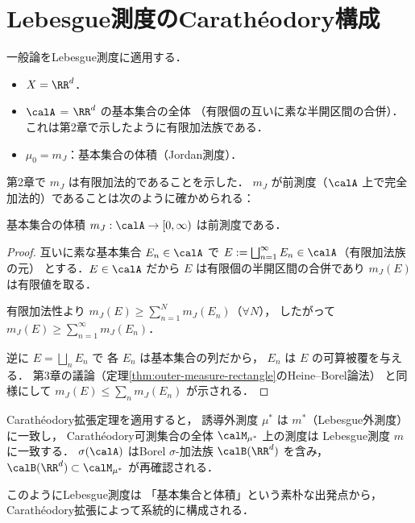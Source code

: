 \section{Lebesgue測度のCarath\'eodory構成}\label{sec:lebesgue-caratheodory}

一般論をLebesgue測度に適用する．

\begin{itemize}
\item $X = \RR^d$．
\item $\calA$ = $\RR^d$ の基本集合の全体
（有限個の互いに素な半開区間の合併）．
これは第2章で示したように有限加法族である．
\item $\mu_0 = m_J$：基本集合の体積（Jordan測度）．
\end{itemize}

第2章で $m_J$ は有限加法的であることを示した．
$m_J$ が前測度（$\calA$ 上で完全加法的）であることは次のように確かめられる：

\begin{proposition}\label{prop:jordan-premeasure}
基本集合の体積 $m_J : \calA \to [0,\infty)$ は前測度である．
\end{proposition}
\begin{proof}
互いに素な基本集合 $E_n \in \calA$ で
$E := \bigsqcup_{n=1}^{\infty} E_n \in \calA$（有限加法族の元）
とする．$E \in \calA$ だから $E$ は有限個の半開区間の合併であり
$m_J(E)$ は有限値を取る．

有限加法性より $m_J(E) \ge \sum_{n=1}^N m_J(E_n)$（$\forall N$），
したがって $m_J(E) \ge \sum_{n=1}^{\infty} m_J(E_n)$．

逆に $E = \bigsqcup_n E_n$ で
各 $E_n$ は基本集合の列だから，
$E_n$ は $E$ の可算被覆を与える．
第3章の議論（定理\ref{thm:outer-measure-rectangle}のHeine--Borel論法）
と同様にして
$m_J(E) \le \sum_n m_J(E_n)$ が示される．
\end{proof}

Carath\'eodory拡張定理を適用すると，
誘導外測度 $\mu^*$ は $m^*$（Lebesgue外測度）に一致し，
Carath\'eodory可測集合の全体 $\calM_{\mu^*}$ 上の測度は
Lebesgue測度 $m$ に一致する．
$\sigma(\calA)$ はBorel $\sigma$-加法族 $\calB(\RR^d)$ を含み，
$\calB(\RR^d) \subset \calM_{\mu^*}$
が再確認される．

このようにLebesgue測度は
「基本集合と体積」という素朴な出発点から，
Carath\'eodory拡張によって系統的に構成される．

